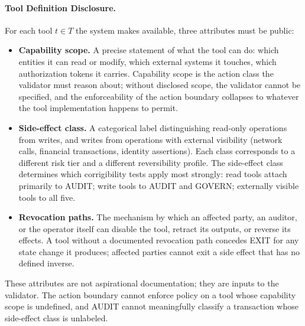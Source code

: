 \documentclass{article}
\theoremstyle{definition}
\begin{document}
\paragraph{Tool Definition Disclosure.} For each tool $t \in T$ the system makes available, three attributes must be public:
\begin{itemize}[noitemsep]
    \item \textbf{Capability scope.} A precise statement of what the tool can do: which entities it can read or modify, which external systems it touches, which authorization tokens it carries. Capability scope is the action class the validator must reason about; without disclosed scope, the validator cannot be specified, and the enforceability of the action boundary collapses to whatever the tool implementation happens to permit.
    \item \textbf{Side-effect class.} A categorical label distinguishing read-only operations from writes, and writes from operations with external visibility (network calls, financial transactions, identity assertions). Each class corresponds to a different risk tier and a different reversibility profile. The side-effect class determines which corrigibility tests apply most strongly: read tools attach primarily to AUDIT; write tools to AUDIT and GOVERN; externally visible tools to all five.
    \item \textbf{Revocation paths.} The mechanism by which an affected party, an auditor, or the operator itself can disable the tool, retract its outputs, or reverse its effects. A tool without a documented revocation path concedes EXIT for any state change it produces; affected parties cannot exit a side effect that has no defined inverse.
\end{itemize}

These attributes are not aspirational documentation; they are inputs to the validator. The action boundary cannot enforce policy on a tool whose capability scope is undefined, and AUDIT cannot meaningfully classify a transaction whose side-effect class is unlabeled.
\end{document}
